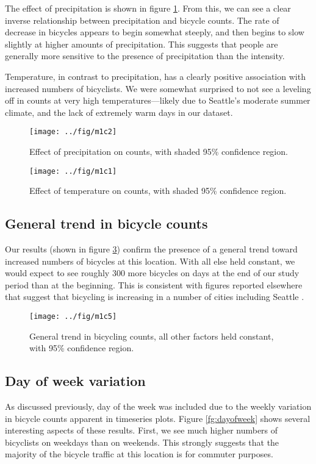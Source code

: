 \documentclass[12pt,letterpaper,article,twocolumn]{memoir}
\begin{document}
The effect of precipitation is shown in figure \ref{fg:precipitation}.
From this, we can see a clear inverse relationship between
precipitation and bicycle counts. The rate of decrease in bicycles
appears to begin somewhat steeply, and then begins to slow slightly at
higher amounts of precipitation. This suggests that people are
generally more sensitive to the presence of precipitation than the
intensity.

Temperature, in contrast to precipitation, has a clearly positive
association with increased numbers of bicyclists. We were somewhat
surprised to not see a leveling off in counts at very high
temperatures---likely due to Seattle's moderate summer climate, and the
lack of extremely warm days in our dataset.

\begin{figure}[ht!]
  \centering
  \texttt{[image: ../fig/m1c2]}
  \caption{Effect of precipitation on counts, with shaded 95\%
    confidence region.}
  \label{fg:precipitation}
\end{figure}

\begin{figure}[ht!]
  \centering
  \texttt{[image: ../fig/m1c1]}
  \caption{Effect of temperature on counts, with shaded 95\%
    confidence region.}
  \label{fg:temperature}
\end{figure}


\FloatBarrier
\subsection*{General trend in bicycle counts}
Our results (shown in figure \ref{fg:trend}) confirm the presence of a
general trend toward increased numbers of bicycles at this location.
With all else held constant, we would expect to see roughly 300 more
bicycles on days at the end of our study period than at the beginning.
This is consistent with figures reported elsewhere that suggest that
bicycling is increasing in a number of cities including
Seattle \parencite{League-of-American-Bicyclists:aa}.

\begin{figure}[ht!]
  \centering
  \texttt{[image: ../fig/m1c5]}
  \caption{General trend in bicycling counts, all other factors held
    constant, with 95\% confidence region.}
  \label{fg:trend}
\end{figure}


\FloatBarrier
\subsection*{Day of week variation}
As discussed previously, day of the week was included due to the
weekly variation in bicycle counts apparent in timeseries plots.
Figure \ref{fg:dayofweek} shows several interesting aspects of these
results. First, we see much higher numbers of bicyclists on weekdays
than on weekends. This strongly suggests that the majority of the
bicycle traffic at this location is for commuter purposes.
\end{document}
